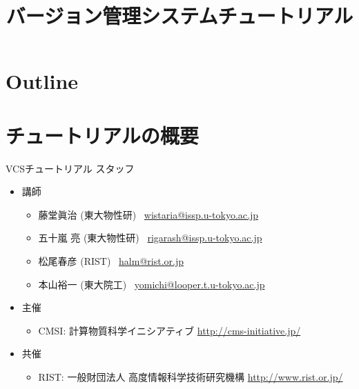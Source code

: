 \title{バージョン管理システムチュートリアル}




\begin{frame}
  \titlepage
\end{frame}

\section*{Outline}
\begin{frame}
  \tableofcontents
\end{frame}

\section{チュートリアルの概要}

\begin{frame}{VCSチュートリアル スタッフ}
  \begin{itemize}
  \item 講師
    \begin{itemize}
    \item 藤堂眞治 (東大物性研) \ \href{mailto:wistaria@issp.u-tokyo.ac.jp}{wistaria@issp.u-tokyo.ac.jp}
    \item 五十嵐 亮 (東大物性研) \ \href{mailto:rigarash@issp.u-tokyo.ac.jp}{rigarash@issp.u-tokyo.ac.jp}
    \item 松尾春彦 (RIST) \ \href{mailto:halm@rist.or.jp}{halm@rist.or.jp}
    \item 本山裕一 (東大院工) \ \href{mailto:yomichi@looper.t.u-tokyo.ac.jp}{yomichi@looper.t.u-tokyo.ac.jp}
    \end{itemize}
  \item 主催
    \begin{itemize}
    \item CMSI: 計算物質科学イニシアティブ \url{http://cms-initiative.jp/}
    \end{itemize}
  \item 共催
    \begin{itemize}
    \item RIST: 一般財団法人 高度情報科学技術研究機構 \url{http://www.rist.or.jp/}
    \end{itemize}
  \end{itemize}
\end{frame}

